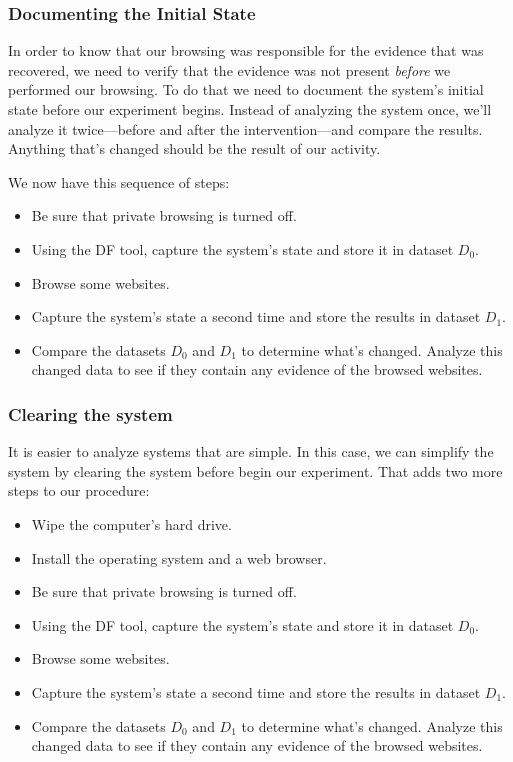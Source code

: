 \subsubsection{Documenting the Initial State}
In order to know that our browsing was responsible for the evidence
that was recovered, we need to verify that the evidence was not
present \emph{before} we performed our browsing. To do that we need to
document the system's initial state before our experiment
begins. Instead of analyzing the system once, we'll analyze it
twice---before and after the intervention---and compare the
results. Anything that's changed should be the result of our activity.

We now have this sequence of steps:


\begin{itemize}
\item Be sure that private browsing is turned off.
\item Using the DF tool, capture the system's state and store it in dataset $D_0$.
\item Browse some websites.
\item Capture the system's state a second time and store the results in dataset $D_1$.
\item Compare the datasets $D_0$ and $D_1$ to determine what's
  changed. Analyze this changed data to see if they contain any
  evidence of the browsed websites. 
\end{itemize}

\subsubsection{Clearing the system}

It is easier to analyze systems that are simple. In this case, we can
simplify the system by clearing the system before begin our
experiment. That adds two more steps to our procedure:

\begin{itemize}
\item Wipe the computer's hard drive.
\item Install the operating system and a web browser.
\item Be sure that private browsing is turned off.
\item Using the DF tool, capture the system's state and store it in dataset $D_0$.
\item Browse some websites.
\item Capture the system's state a second time and store the results in dataset $D_1$.
\item Compare the datasets $D_0$ and $D_1$ to determine what's
  changed. Analyze this changed data to see if they contain any
  evidence of the browsed websites. 
\end{itemize}


